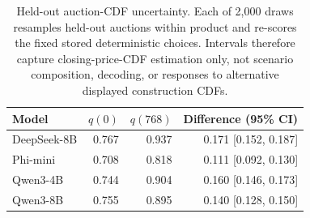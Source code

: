 \begin{table}[H]
\centering
\caption{Held-out auction-CDF uncertainty. Each of 2,000 draws resamples held-out auctions within product and re-scores the fixed stored deterministic choices. Intervals therefore capture closing-price-CDF estimation only, not scenario composition, decoding, or responses to alternative displayed construction CDFs.}
\label{tab:auctioncdf}
\small
\setlength{\tabcolsep}{4pt}
\begin{tabular}{lrrr}
\toprule
Model & $q(0)$ & $q(768)$ & Difference (95\% CI) \\
\midrule
DeepSeek-8B & 0.767 & 0.937 & 0.171 [0.152, 0.187] \\
Phi-mini & 0.708 & 0.818 & 0.111 [0.092, 0.130] \\
Qwen3-4B & 0.744 & 0.904 & 0.160 [0.146, 0.173] \\
Qwen3-8B & 0.755 & 0.895 & 0.140 [0.128, 0.150] \\
\bottomrule
\end{tabular}
\end{table}

